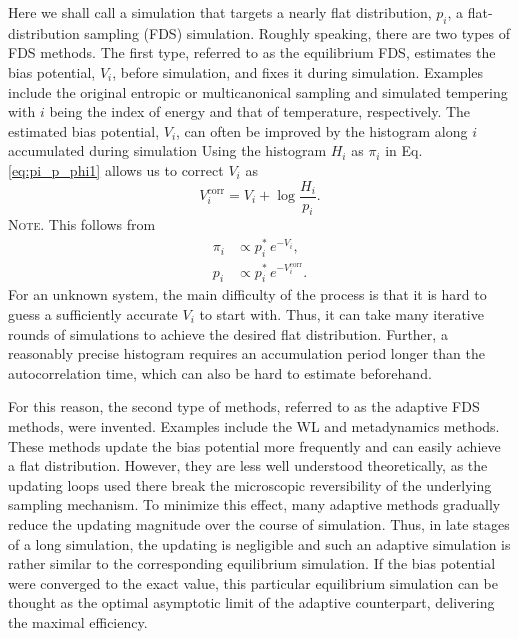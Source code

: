 \documentclass[reprint, floatfix]{revtex4-1}
\newcommand{\note}[1]{{\color{DarkGreen}\footnotesize \textsc{Note.} #1}}
\begin{document}
Here we shall call a simulation that targets
a nearly flat distribution\cite{dayal2004, trebst2004, singh2011},
$p_i$,
a flat-distribution sampling (FDS) simulation.
%
Roughly speaking, there are two types of FDS methods.
%
The first type,
referred to as the equilibrium FDS, %
estimates the bias potential, $V_i$,
before simulation,
and fixes it during simulation.
%
Examples include the original
entropic or multicanonical sampling\cite{berg1992, lee1993}
and simulated tempering\cite{marinari1992, lyubartsev1992}
with $i$ being the index of energy
and that of temperature, respectively.
%
The estimated bias potential, $V_i$,
can often be improved
by the histogram along $i$ accumulated
during simulation
Using the histogram $H_i$ as $\pi_i$ in
Eq. \eqref{eq:pi_p_phi1}
allows us to correct $V_i$ as
%
\begin{equation}
V^\mathrm{corr}_i
=
V_i
+
\log \frac{ H_i }
          { p_i }.
\label{eq:vcorr_equil}
\end{equation}
%
\note{This follows from
  $$
  \begin{aligned}
    \pi_i &\propto p^*_i \, e^{-V_i}, \\
    p_i &\propto p^*_i \, e^{-V^\mathrm{corr}_i}.
  \end{aligned}
  $$
}
For an unknown system,
the main difficulty of the process
is that it is hard to guess a sufficiently accurate
$V_i$ to start with.
%
Thus,
it can take many iterative rounds of simulations
to achieve the desired flat distribution.
%
Further, a reasonably precise histogram
requires an accumulation period
longer than the autocorrelation time,
which can also be hard to estimate beforehand.

For this reason, the second type of methods,
referred to as the adaptive FDS methods,
were invented.
%
Examples include
the WL and metadynamics methods.
%
These methods update the bias potential more frequently
and can easily achieve a flat distribution.
%
However, they are less well understood theoretically,
as the updating loops used there
break the microscopic reversibility
of the underlying sampling mechanism.
%
%
To minimize this effect,
many adaptive methods gradually
reduce the updating magnitude
over the course of simulation\cite{marsili2006,
liang2007,
belardinelli2007, belardinelli2007jcp, belardinelli2008}.
%
Thus, in late stages of a long simulation,
the updating is negligible and
such an adaptive simulation is rather similar
to the corresponding equilibrium simulation.
%
If the bias potential were converged to the exact value,
this particular equilibrium simulation can be thought as
the optimal asymptotic limit of the adaptive counterpart,
delivering the maximal efficiency.
\end{document}
